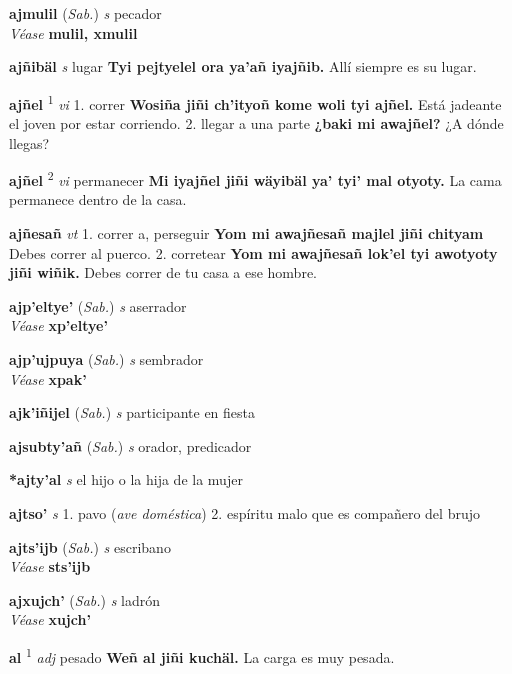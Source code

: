 \documentclass[10pt]{scrbook}
\newcommand{\entry}[1]{\textbf{#1}}
\newcommand{\onedefinition}[1]{#1.}
\newcommand{\defsuperscript}[1]{\textsuperscript{#1}}
\newcommand{\partofspeech}[1]{\textit{#1}}
\newcommand{\spanishtranslation}[1]{#1}
\newcommand{\clarification}[1]{(\textit{#1})}
\newcommand{\cholexample}[1]{\textbf{#1}}
\newcommand{\exampletranslation}[1]{#1}
\newcommand{\alsosee}[1]{\\\textit{Véase} \textbf{#1}}
\newcommand{\relevantdialect}[1]{(\textit{#1})}
\begin{document}
\begin{multicols}{2}
\entry{ajmulil}
\relevantdialect{Sab.}
\partofspeech{s}
\spanishtranslation{pecador}
\alsosee{mulil, xmulil}

\entry{ajñibäl}
\partofspeech{s}
\spanishtranslation{lugar}
\cholexample{Tyi pejtyelel ora ya'añ iyajñib.}
\exampletranslation{Allí siempre es su lugar.}

\entry{ajñel}
\defsuperscript{1}
\partofspeech{vi}
\onedefinition{1}
\spanishtranslation{correr}
\cholexample{Wosiña jiñi ch'ityoñ kome woli tyi ajñel.}
\exampletranslation{Está jadeante el joven por estar corriendo.}
\onedefinition{2}
\spanishtranslation{llegar a una parte}
\cholexample{¿baki mi awajñel?}
\exampletranslation{¿A dónde llegas?}

\entry{ajñel}
\defsuperscript{2}
\partofspeech{vi}
\spanishtranslation{permanecer}
\cholexample{Mi iyajñel jiñi wäyibäl ya' tyi' mal otyoty.}
\exampletranslation{La cama permanece dentro de la casa.}

\entry{ajñesañ}
\partofspeech{vt}
\onedefinition{1}
\spanishtranslation{correr a, perseguir}
\cholexample{Yom mi awajñesañ majlel jiñi chityam}
\exampletranslation{Debes correr al puerco.}
\onedefinition{2}
\spanishtranslation{corretear}
\cholexample{Yom mi awajñesañ lok'el tyi awotyoty jiñi wiñik.}
\exampletranslation{Debes correr de tu casa a ese hombre.}

\entry{ajp'eltye'}
\relevantdialect{Sab.}
\partofspeech{s}
\spanishtranslation{aserrador}
\alsosee{xp'eltye'}

\entry{ajp'ujpuya}
\relevantdialect{Sab.}
\partofspeech{s}
\spanishtranslation{sembrador}
\alsosee{xpak'}

\entry{ajk'iñijel}
\relevantdialect{Sab.}
\partofspeech{s}
\spanishtranslation{participante en fiesta}

\entry{ajsubty'añ}
\relevantdialect{Sab.}
\partofspeech{s}
\spanishtranslation{orador, predicador}

\entry{*ajty'al}
\partofspeech{s}
\spanishtranslation{el hijo o la hija de la mujer}

\entry{ajtso'}
\partofspeech{s}
\onedefinition{1}
\spanishtranslation{pavo}
\clarification{ave doméstica}
\onedefinition{2}
\spanishtranslation{espíritu malo que es compañero del brujo}

\entry{ajts'ijb}
\relevantdialect{Sab.}
\partofspeech{s}
\spanishtranslation{escribano}
\alsosee{sts'ijb}

\entry{ajxujch'}
\relevantdialect{Sab.}
\partofspeech{s}
\spanishtranslation{ladrón}
\alsosee{xujch'}

\entry{al}
\defsuperscript{1}
\partofspeech{adj}
\spanishtranslation{pesado}
\cholexample{Weñ al jiñi kuchäl.}
\exampletranslation{La carga es muy pesada.}


\end{multicols}
\end{document}
